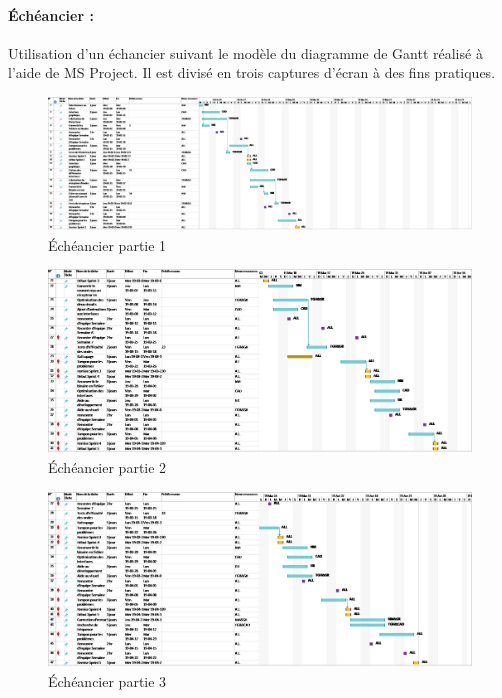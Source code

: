 \paragraph{Échéancier :}
Utilisation d'un échancier suivant le modèle du diagramme de Gantt réalisé à l'aide de MS Project. Il est divisé en trois captures d'écran à des fins pratiques.

\begin{figure}[ht!]
    \centering
    \caption{Échéancier partie 1}
    \includegraphics[width=0.8\linewidth]{images/echeancier/echeancier_partie_1.png}
\end{figure}

\begin{figure}[ht!]
    \centering
    \caption{Échéancier partie 2}
    \includegraphics[width=0.8\linewidth]{images/echeancier/echeancier_partie_2.png}
\end{figure}

\begin{figure}[ht!]
    \centering
    \caption{Échéancier partie 3}
    \includegraphics[width=0.8\linewidth]{images/echeancier/echeancier_partie_3.png}
\end{figure}